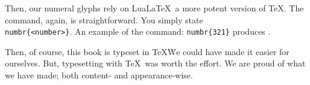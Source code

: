 Then, our numeral glyphs rely on Lua\LaTeX\, a more potent version of \TeX. The command, again, is straightforward. You simply state \texttt{\\numbr\{<number>\footnotemark\}}.   An example of the command: \texttt{numbr\{321\}} produces .  

Then, of course, this book is typeset in \TeX\. We could have made it easier for ourselves. But, typesetting with \TeX\ was worth the effort. We are proud of what we have made; both content- and appearance-wise.    









